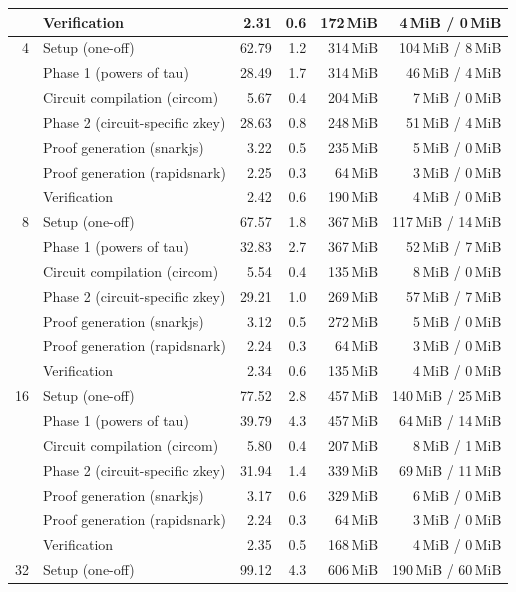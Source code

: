 \begin{table}[t]
{\begin{tabular}{|r|l|r|r|r|r|}
 & Verification & 2.31 & 0.6 & 172\,MiB & 4\,MiB / 0\,MiB \\
\hline
4 & Setup (one-off) & 62.79 & 1.2 & 314\,MiB & 104\,MiB / 8\,MiB \\
 & \quad Phase 1 (powers of tau) & 28.49 & 1.7 & 314\,MiB & 46\,MiB / 4\,MiB \\
 & \quad Circuit compilation (circom) & 5.67 & 0.4 & 204\,MiB & 7\,MiB / 0\,MiB \\
 & \quad Phase 2 (circuit-specific zkey) & 28.63 & 0.8 & 248\,MiB & 51\,MiB / 4\,MiB \\
 & Proof generation (snarkjs) & 3.22 & 0.5 & 235\,MiB & 5\,MiB / 0\,MiB \\
 & Proof generation (rapidsnark) & 2.25 & 0.3 & 64\,MiB & 3\,MiB / 0\,MiB \\
 & Verification & 2.42 & 0.6 & 190\,MiB & 4\,MiB / 0\,MiB \\
\hline
8 & Setup (one-off) & 67.57 & 1.8 & 367\,MiB & 117\,MiB / 14\,MiB \\
 & \quad Phase 1 (powers of tau) & 32.83 & 2.7 & 367\,MiB & 52\,MiB / 7\,MiB \\
 & \quad Circuit compilation (circom) & 5.54 & 0.4 & 135\,MiB & 8\,MiB / 0\,MiB \\
 & \quad Phase 2 (circuit-specific zkey) & 29.21 & 1.0 & 269\,MiB & 57\,MiB / 7\,MiB \\
 & Proof generation (snarkjs) & 3.12 & 0.5 & 272\,MiB & 5\,MiB / 0\,MiB \\
 & Proof generation (rapidsnark) & 2.24 & 0.3 & 64\,MiB & 3\,MiB / 0\,MiB \\
 & Verification & 2.34 & 0.6 & 135\,MiB & 4\,MiB / 0\,MiB \\
\hline
16 & Setup (one-off) & 77.52 & 2.8 & 457\,MiB & 140\,MiB / 25\,MiB \\
 & \quad Phase 1 (powers of tau) & 39.79 & 4.3 & 457\,MiB & 64\,MiB / 14\,MiB \\
 & \quad Circuit compilation (circom) & 5.80 & 0.4 & 207\,MiB & 8\,MiB / 1\,MiB \\
 & \quad Phase 2 (circuit-specific zkey) & 31.94 & 1.4 & 339\,MiB & 69\,MiB / 11\,MiB \\
 & Proof generation (snarkjs) & 3.17 & 0.6 & 329\,MiB & 6\,MiB / 0\,MiB \\
 & Proof generation (rapidsnark) & 2.24 & 0.3 & 64\,MiB & 3\,MiB / 0\,MiB \\
 & Verification & 2.35 & 0.5 & 168\,MiB & 4\,MiB / 0\,MiB \\
\hline
32 & Setup (one-off) & 99.12 & 4.3 & 606\,MiB & 190\,MiB / 60\,MiB \\

\end{tabular}}
\end{table}
